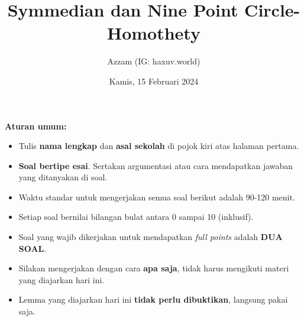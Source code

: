 \documentclass[12pt]{scrartcl}
\title{Symmedian dan Nine Point Circle-Homothety}
\author{Azzam (IG: haxuv.world)}
\date{Kamis, 15 Februari 2024}
\begin{document}
\maketitle

\renewcommand*\contentsname{Daftar Isi}
\tableofcontents

\newpage
\textbf{Aturan umum:}
\begin{itemize}
    \item Tulis \textbf{nama lengkap} dan \textbf{asal sekolah} di pojok kiri atas halaman pertama.
    \item \textbf{Soal bertipe esai}. Sertakan argumentasi atau cara mendapatkan jawaban yang ditanyakan di soal.
    \item Waktu standar untuk mengerjakan semua soal berikut adalah 90-120 menit.
    \item Setiap soal bernilai bilangan bulat antara 0 sampai 10 (inklusif).
    \item Soal yang wajib dikerjakan untuk mendapatkan \textit{full points} adalah \textbf{DUA SOAL}.
    \item Silakan mengerjakan dengan cara \textbf{apa saja}, tidak harus mengikuti materi yang diajarkan hari ini.
    \item Lemma yang diajarkan hari ini \textbf{tidak perlu dibuktikan}, langsung pakai saja.
\end{itemize}

\newpage
\end{document}
